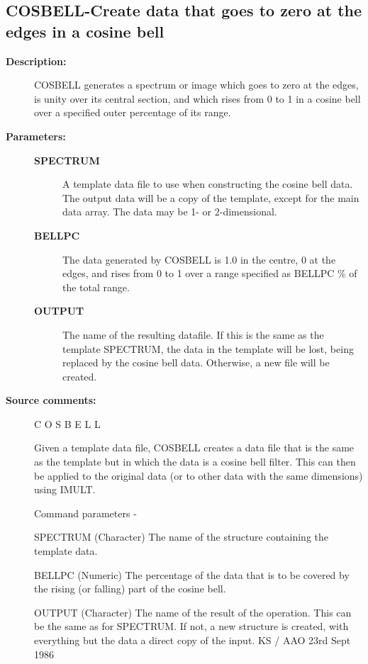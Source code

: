 \begin{description}
\subsection{COSBELL-\label{COSBELL}Create data that goes to zero at the edges in a cosine bell}

\begin{description}
\item [\textbf{Description:}]
 COSBELL generates a spectrum or image which goes to zero at the
 edges, is unity over its central section, and which rises from
 0 to 1 in a cosine bell over a specified outer percentage of
 its range.

\item [\textbf{Parameters:}]
\begin{description}
\item [\textbf{SPECTRUM}]
 A template data file to use when constructing the
 cosine bell data.  The output data will be a copy
 of the template, except for the main data array.
 The data may be 1- or 2-dimensional.
\item [\textbf{BELLPC}]
 The data generated by COSBELL is 1.0 in the centre,
 0 at the edges, and rises from 0 to 1 over a range
 specified as BELLPC \% of the total range.
\item [\textbf{OUTPUT}]
 The name of the resulting datafile.
 If this is the same as the template SPECTRUM, the data
 in the template will be lost, being replaced by the
 cosine bell data.  Otherwise, a new file will be created.
\end{description}

\item [\textbf{Source comments:}]
\begin{terminalv}
 C O S B E L L

 Given a template data file, COSBELL creates a data file that is
 the same as the template but in which the data is a cosine bell
 filter.  This can then be applied to the original data (or to
 other data with the same dimensions) using IMULT.

 Command parameters -

 SPECTRUM (Character) The name of the structure containing the
          template data.

 BELLPC   (Numeric) The percentage of the data that is to be covered
          by the rising (or falling) part of the cosine bell.

 OUTPUT   (Character) The name of the result of the operation.  This
          can be the same as for SPECTRUM. If not, a new structure
          is created, with everything but the data a direct
          copy of the input.
                                             KS / AAO 23rd Sept 1986
\end{terminalv}
\end{description}

\end{description}

